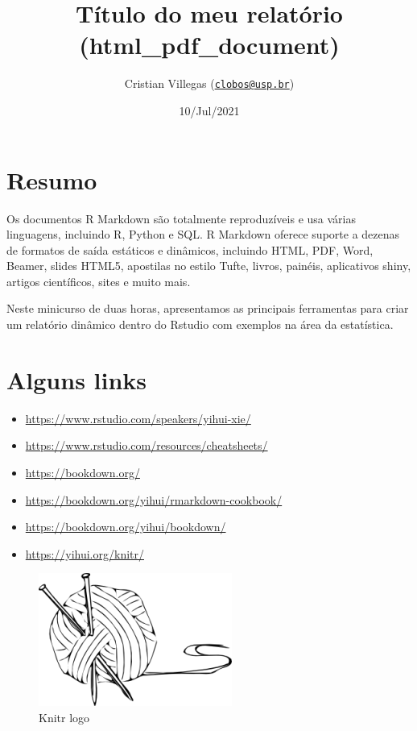 \documentclass[12pt,brazil,]{article}
\title{Título do meu relatório (html\_pdf\_document)}
\author{Cristian Villegas
(\href{mailto:clobos@usp.br}{\nolinkurl{clobos@usp.br}})}
\date{10/Jul/2021}
\begin{document}
\maketitle

{
\setcounter{tocdepth}{2}
\tableofcontents
}
\hypertarget{resumo}{%
\section*{Resumo}\label{resumo}}

Os documentos R Markdown são totalmente reproduzíveis e usa várias
linguagens, incluindo R, Python e SQL. R Markdown oferece suporte a
dezenas de formatos de saída estáticos e dinâmicos, incluindo HTML, PDF,
Word, Beamer, slides HTML5, apostilas no estilo Tufte, livros, painéis,
aplicativos shiny, artigos científicos, sites e muito mais.

Neste minicurso de duas horas, apresentamos as principais ferramentas
para criar um relatório dinâmico dentro do Rstudio com exemplos na área
da estatística.

\newpage

\hypertarget{links}{%
\section{Alguns links}\label{links}}

\begin{itemize}
\item
  \url{https://www.rstudio.com/speakers/yihui-xie/}
\item
  \url{https://www.rstudio.com/resources/cheatsheets/}
\item
  \url{https://bookdown.org/}
\item
  \url{https://bookdown.org/yihui/rmarkdown-cookbook/}
\item
  \url{https://bookdown.org/yihui/bookdown/}
\item
  \url{https://yihui.org/knitr/}
\end{itemize}

\begin{figure}

{\centering \includegraphics[width=0.5\linewidth]{knit_logo} 

}

\caption{Knitr logo}\label{fig:unnamed-chunk-3}
\end{figure}
\end{document}
